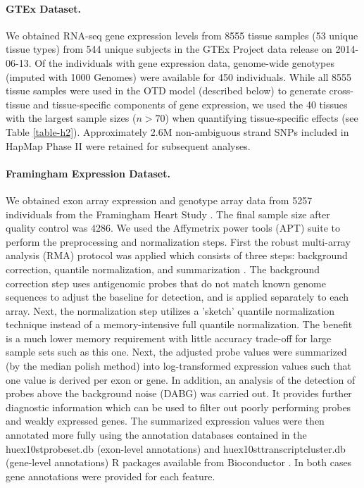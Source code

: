 \documentclass[10pt,letterpaper]{article}
\begin{document}
\paragraph*{GTEx Dataset.}\label{gtex-dataset}

We obtained RNA-seq gene expression levels from 8555 tissue samples (53
unique tissue types) from 544 unique subjects in the GTEx Project \cite{Ardlie_2015} 
data release on 2014-06-13. Of the individuals with gene
expression data, genome-wide genotypes (imputed with 1000 Genomes) were
available for 450 individuals. While all 8555 tissue samples were used
in the OTD model (described below) to generate cross-tissue and
tissue-specific components of gene expression, we used the 40 tissues
with the largest sample sizes ($n>70$) when quantifying tissue-specific effects (see Table \ref{table-h2}).
Approximately 2.6M non-ambiguous strand SNPs included in HapMap Phase II were retained for
subsequent analyses.

\paragraph*{Framingham Expression Dataset.}\label{framingham-dataset}

We obtained exon array expression and genotype array data from 5257 individuals from the Framingham Heart Study \cite{Zhang_2015}. The final sample size after quality control was 4286. We used the Affymetrix power tools (APT) suite to perform the preprocessing and normalization steps. First the robust multi-array analysis (RMA) protocol was applied which consists of three steps: background correction, quantile normalization, and summarization \cite{irizarry2003summaries}. The background correction step uses antigenomic probes that do not match known genome sequences to adjust the baseline for detection, and is applied separately to each array. Next, the normalization step utilizes a 'sketch' quantile normalization technique instead of a memory-intensive full quantile normalization. The benefit is a much lower memory requirement with little accuracy trade-off for large sample sets such as this one. Next, the adjusted probe values were summarized (by the median polish method) into log-transformed expression values such that one value is derived per exon or gene. In addition, an analysis of the detection of probes above the background noise (DABG) was carried out. It provides further diagnostic information which can be used to filter out poorly performing probes and weakly expressed genes.  The summarized expression values were then annotated more fully using the annotation databases contained in the huex10stprobeset.db (exon-level annotations) and huex10sttranscriptcluster.db (gene-level annotations) R packages available from Bioconductor \cite{MacDonald_1,MacDonald_2}. In both cases gene annotations were provided for each feature. 
\end{document}
